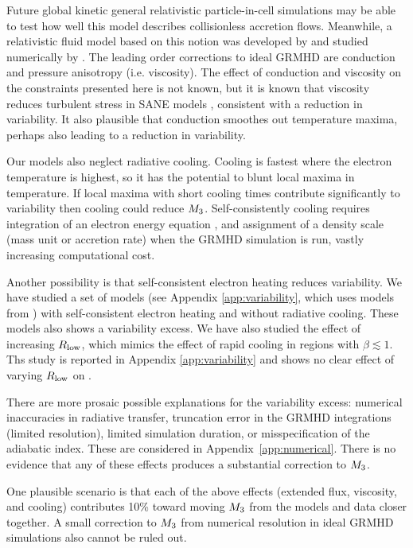 Future global kinetic general relativistic particle-in-cell simulations may be able to test how well this model describes collisionless accretion flows.  Meanwhile, a relativistic fluid model based on this notion was developed by \citet{2015ApJ...810..162C} and studied numerically by \citet{2017MNRAS.470.2240F}.  The leading order corrections to ideal GRMHD are conduction and pressure anisotropy (i.e. viscosity).  The effect of conduction and viscosity on the constraints presented here is not known, but it is known that viscosity reduces turbulent stress in SANE models \citep{2017MNRAS.470.2240F}, consistent with a reduction in variability.  It also plausible that conduction smoothes out temperature maxima, perhaps also leading to a reduction in variability.  

Our models also neglect radiative cooling.  
Cooling is fastest where the electron temperature is highest, so it has the potential to blunt  local maxima in temperature.  If local maxima with short cooling times contribute significantly to variability then cooling could reduce $M_{3}$.  Self-consistently cooling requires integration of an electron energy equation  \citep[e.g.]{2015MNRAS.454.1848R}, and assignment of a density scale (mass unit or accretion rate) when the GRMHD simulation is run, vastly increasing computational cost.

Another possibility is that self-consistent electron heating reduces variability.  We have studied a set of models (see Appendix \ref{app:variability}, which uses models from \citet{2020MNRAS.494.4168D})
with self-consistent electron heating and without radiative cooling.  These models also shows a variability excess.  We have also studied the effect of increasing $R_\mathrm{low}$, which mimics the effect of rapid cooling in regions with $\beta \lesssim 1$.  Ths study is reported in Appendix \ref{app:variability} and shows no clear effect of varying $R_\mathrm{low}$ on .  

There are more prosaic possible explanations for the variability excess: numerical inaccuracies in radiative transfer, truncation error in the GRMHD integrations (limited resolution), limited simulation duration, or misspecification of the adiabatic index.  These are considered in Appendix~\ref{app:numerical}.  There is no evidence that any of these effects produces a substantial correction to $M_{3}$.

One plausible scenario is that each of the above effects (extended flux, viscosity, and cooling) contributes 10\% toward moving $M_{3}$ from the models and data closer together. A small correction to $M_{3}$ from numerical resolution in ideal GRMHD simulations also cannot be ruled out.


